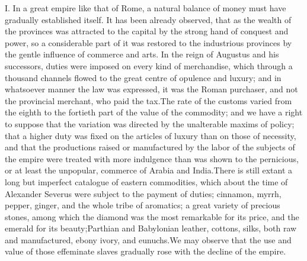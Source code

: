 I. In a great empire like that of Rome, a natural balance of
money must have gradually established itself. It has been already
observed, that as the wealth of the provinces was attracted to
the capital by the strong hand of conquest and power, so a
considerable part of it was restored to the industrious provinces
by the gentle influence of commerce and arts. In the reign of
Augustus and his successors, duties were imposed on every kind of
merchandise, which through a thousand channels flowed to the
great centre of opulence and luxury; and in whatsoever manner the
law was expressed, it was the Roman purchaser, and not the
provincial merchant, who paid the tax.\footnotemark[97] The rate of the customs
varied from the eighth to the fortieth part of the value of the
commodity; and we have a right to suppose that the variation was
directed by the unalterable maxims of policy; that a higher duty
was fixed on the articles of luxury than on those of necessity,
and that the productions raised or manufactured by the labor of
the subjects of the empire were treated with more indulgence than
was shown to the pernicious, or at least the unpopular, commerce
of Arabia and India.\footnotemark[98] There is still extant a long but
imperfect catalogue of eastern commodities, which about the time
of Alexander Severus were subject to the payment of duties;
cinnamon, myrrh, pepper, ginger, and the whole tribe of
aromatics; a great variety of precious stones, among which the
diamond was the most remarkable for its price, and the emerald
for its beauty;\footnotemark[99] Parthian and Babylonian leather, cottons,
silks, both raw and manufactured, ebony ivory, and eunuchs.\footnotemark[100]
We may observe that the use and value of those effeminate slaves
gradually rose with the decline of the empire.





